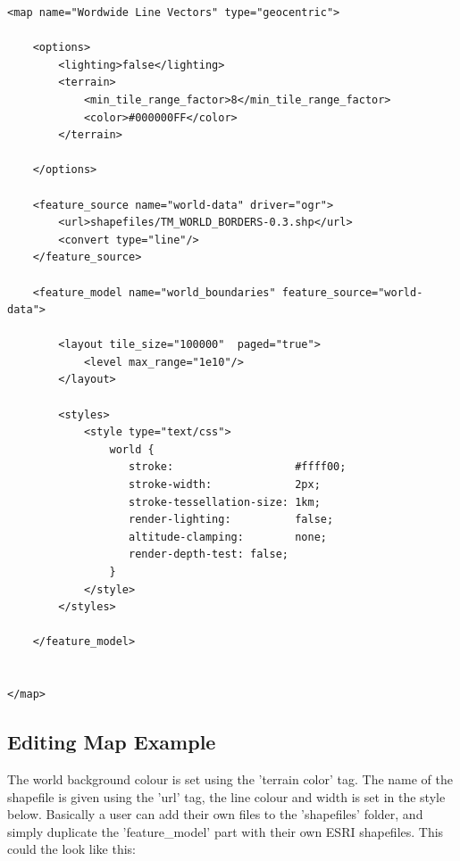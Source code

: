 \begin{lstlisting}
<map name="Wordwide Line Vectors" type="geocentric">
  
    <options>
        <lighting>false</lighting>
        <terrain>
            <min_tile_range_factor>8</min_tile_range_factor>
            <color>#000000FF</color>
        </terrain>
      
    </options>

    <feature_source name="world-data" driver="ogr">
        <url>shapefiles/TM_WORLD_BORDERS-0.3.shp</url>
        <convert type="line"/>
    </feature_source>
    
    <feature_model name="world_boundaries" feature_source="world-data">
        
        <layout tile_size="100000"  paged="true">
            <level max_range="1e10"/>
        </layout>
                
        <styles>
            <style type="text/css">
                world {
                   stroke:                   #ffff00;
                   stroke-width:             2px;
                   stroke-tessellation-size: 1km;
                   render-lighting:          false;
                   altitude-clamping:        none;
                   render-depth-test: false;
                }            
            </style>
        </styles>
        
    </feature_model>
 

</map>
\end{lstlisting}

\subsection{Editing Map Example}

The world background colour is set using the 'terrain color' tag. The name of the shapefile is given using the 'url' tag, the line colour and width is set in the style below. Basically a user can add their own files to the 'shapefiles' folder, and simply duplicate the 'feature\_model' part with their own ESRI shapefiles. This could the look like this:

